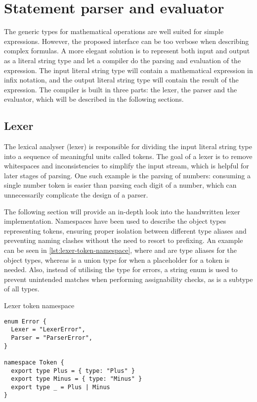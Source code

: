\section{Statement parser and evaluator}

The generic types for mathematical operations are well suited for simple expressions. However, the proposed interface can be too verbose when describing complex formulas. A more elegant solution is to represent both input and output as a literal string type and let a compiler do the parsing and evaluation of the expression. The input literal string type will contain a mathematical expression in infix notation, and the output literal string type will contain the result of the expression. The compiler is built in three parts: the lexer, the parser and the evaluator, which will be described in the following sections.

\subsection{Lexer}

The lexical analyser (lexer) is responsible for dividing the input literal string type into a sequence of meaningful units called tokens. The goal of a lexer is to remove whitespaces and inconsistencies to simplify the input stream, which is helpful for later stages of parsing. One such example is the parsing of numbers: consuming a single number token is easier than parsing each digit of a number, which can unnecessarily complicate the design of a parser.

The following section will provide an in-depth look into the handwritten lexer implementation. Namespaces have been used to describe the object types representing tokens, ensuring proper isolation between different type aliases and preventing naming clashes without the need to resort to prefixing. An example can be seen in \ref{lst:lexer-token-namespace}, where  and  are type aliases for the object types, whereas \vcode{_} is a union type for when a placeholder for a token is needed. Also, instead of utilising the  type for errors, a string enum is used to prevent unintended matches when performing assignability checks, as  is a subtype of all types.

\begin{listing}[ht]
  \caption{Lexer token namespace}\label{lst:lexer-token-namespace}
  \begin{verbatim}
enum Error {
  Lexer = "LexerError",
  Parser = "ParserError",
}

namespace Token {
  export type Plus = { type: "Plus" } 
  export type Minus = { type: "Minus" } 
  export type _ = Plus | Minus
} 
\end{verbatim}
\end{listing}

